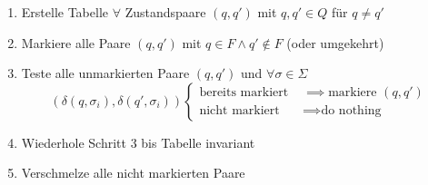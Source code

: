 \documentclass[a4paper,parskip=half,footsepline=on,headings=normal,titlepage=false]{scrartcl}
\begin{document}
\begin{enumerate}
	\item Erstelle Tabelle $\forall$ Zustandspaare $(q, q')$ mit $q, q' \in Q$ für $q \ne q'$
	\item Markiere alle Paare $(q, q')$ mit $q\in F \land q'\notin F$ (oder umgekehrt)
	\item Teste alle unmarkierten Paare $(q, q')$ und $\forall \sigma \in \Sigma$
		\[
			(\delta(q,\sigma_i), \delta(q',\sigma_i))
			\begin{cases}
				\text{bereits markiert } & \implies \text{markiere } (q, q') \\
				\text{nicht markiert } & \implies \text{do nothing}
			\end{cases}
		\]
	\item Wiederhole Schritt 3 bis Tabelle invariant
	\item Verschmelze alle nicht markierten Paare
\end{enumerate}
\end{document}
